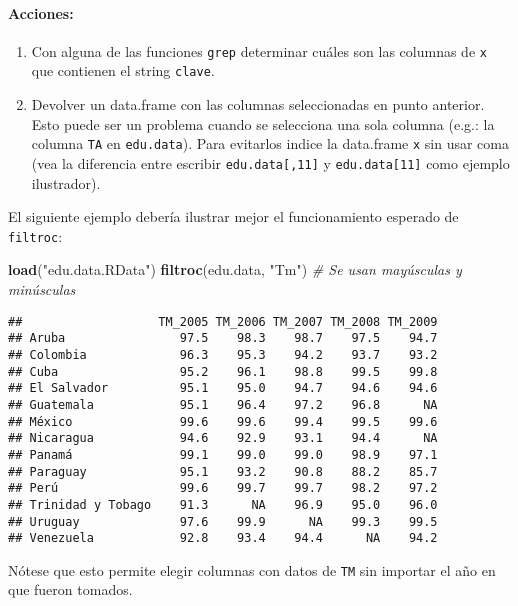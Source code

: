 \documentclass[]{article}
\newenvironment{Shaded}{}{}
\newcommand{\KeywordTok}[1]{\textcolor[rgb]{0.00,0.44,0.13}{\textbf{{#1}}}}
\newcommand{\StringTok}[1]{\textcolor[rgb]{0.25,0.44,0.63}{{#1}}}
\newcommand{\CommentTok}[1]{\textcolor[rgb]{0.38,0.63,0.69}{\textit{{#1}}}}
\newcommand{\NormalTok}[1]{{#1}}
\begin{document}
\paragraph{Acciones:}

\begin{enumerate}[1.]
\item
  Con alguna de las funciones \texttt{grep} determinar cuáles son las
  columnas de \texttt{x} que contienen el string \texttt{clave}.
\item
  Devolver un data.frame con las columnas seleccionadas en punto
  anterior. Esto puede ser un problema cuando se selecciona una sola
  columna (e.g.: la columna \texttt{TA} en \texttt{edu.data}). Para
  evitarlos indice la data.frame \texttt{x} sin usar coma (vea la
  diferencia entre escribir \texttt{edu.data{[},11{]}} y
  \texttt{edu.data{[}11{]}} como ejemplo ilustrador).
\end{enumerate}

El siguiente ejemplo debería ilustrar mejor el funcionamiento esperado
de \texttt{filtroc}:

\begin{Shaded}
\begin{Highlighting}[]
\KeywordTok{load}\NormalTok{(}\StringTok{"edu.data.RData"}\NormalTok{)}
\KeywordTok{filtroc}\NormalTok{(edu.data, }\StringTok{"Tm"}\NormalTok{)  }\CommentTok{# Se usan mayúsculas y minúsculas}
\end{Highlighting}
\end{Shaded}

\begin{verbatim}
##                   TM_2005 TM_2006 TM_2007 TM_2008 TM_2009
## Aruba                97.5    98.3    98.7    97.5    94.7
## Colombia             96.3    95.3    94.2    93.7    93.2
## Cuba                 95.2    96.1    98.8    99.5    99.8
## El Salvador          95.1    95.0    94.7    94.6    94.6
## Guatemala            95.1    96.4    97.2    96.8      NA
## México               99.6    99.6    99.4    99.5    99.6
## Nicaragua            94.6    92.9    93.1    94.4      NA
## Panamá               99.1    99.0    99.0    98.9    97.1
## Paraguay             95.1    93.2    90.8    88.2    85.7
## Perú                 99.6    99.7    99.7    98.2    97.2
## Trinidad y Tobago    91.3      NA    96.9    95.0    96.0
## Uruguay              97.6    99.9      NA    99.3    99.5
## Venezuela            92.8    93.4    94.4      NA    94.2
\end{verbatim}

Nótese que esto permite elegir columnas con datos de \texttt{TM} sin
importar el año en que fueron tomados.
\end{document}
